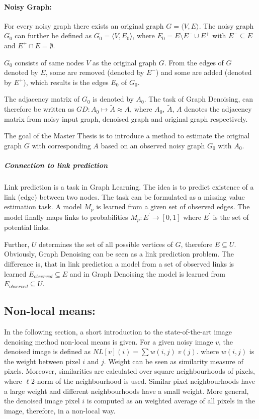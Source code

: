 \paragraph{Noisy Graph:}
For every noisy graph there exists an original graph $G = \langle V,E \rangle$.
The noisy graph $G_0$ can further be defined as $G_0 = \langle V, E_0 \rangle$,  
 where $E_0 = E \setminus  E^{-} \cup  E^{+}$ with $E^{-} \subseteq E$ and $E^{+} \cap E = \emptyset$.

$G_0$ consists of same nodes $V$ as the original graph $G$. 
From the edges of $G$ denoted by $E$, some are removed (denoted by $E^{-}$) and some are added
(denoted by $E^{+}$), which results is the edges $E_0$ of $G_0$.

The adjacency matrix of $G_0$ is denoted by $A_0$.
The task of Graph Denoising, can therefore be written as $GD: A_0 \mapsto \tilde{A} \approx A$,
where $A_0$, $\tilde{A}$, $A$ denotes the adjacency matrix from noisy input graph, denoised
 graph and original graph respectively.

 \begin{tcolorbox}[colback=red!5!white,colframe=red!75!black]
    The goal of the Master Thesis is to introduce a method to estimate 
    the original graph $G$ with corresponding $A$ based on an observed noisy graph $G_0$ with $A_0$.
\end{tcolorbox}

\subparagraph{Connection to link prediction}
Link prediction is a task in Graph Learning. 
The idea is to predict existence of a link (edge) between two nodes.
The task can be formulated as a missing value estimation task. A model $M_p$ is learned
from a given set of observed edges. The model finally maps links to probabilities
$M_p : E^{\prime} \rightarrow [0,1]$ where $E^{\prime}$ is the set of potential links.

Further, $U$ determines the set of all possible vertices of $G$, therefore $E \subseteq U$.
Obviously, Graph Denoising can be seen as a link prediction problem.
The difference is, that in link prediction a model from a set of observed links is learned
$E_{observed} \subseteq E$ and in Graph Denoising the model is learned from 
$E_{observed} \subseteq U$. 

\subsection{Non-local means:}
In the following section, a short introduction to the 
state-of-the-art image denoising method non-local means is given\cite{noneLocalMean}.
For a given noisy image $v$, the denoised image is defined as $NL[v](i) = \sum{w(i,j) \; v(j)}$.
where $w(i,j)$ is the weight between pixel $i$ and $j$. 
Weight can be seen as similarity measure of pixels.
Moreover, similarities are calculated over square neighbourhoods of pixels,
where $\ell2$-norm of the neighbourhood is used.
Similar pixel neighbourhoods have a large weight and different neighbourhoods have a small weight.
More general, the denoised image pixel $i$ is computed as an weighted average of all pixels in the 
image, therefore, in a non-local way.

